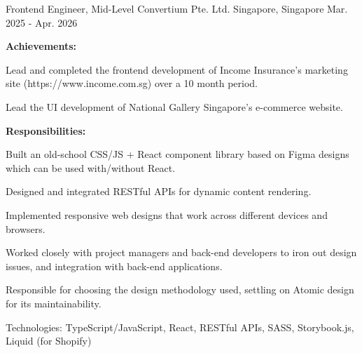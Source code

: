 

\begin{cventries}

  \cventry
    {Frontend Engineer, Mid-Level} %
    {Convertium Pte. Ltd.} %
    {Singapore, Singapore} %
    {Mar. 2025 - Apr. 2026} %
    {
      \textbf{Achievements:}
      \vspace{1.5em}
      \begin{cvitems} %
        \item {Lead and completed the frontend development of Income Insurance's marketing site (https://www.income.com.sg) over a 10 month period.}
        \item {Lead the UI development of National Gallery Singapore's e-commerce website.}
      \end{cvitems}
      \textbf{Responsibilities:}
      \vspace{1.5em}
      \begin{cvitems} %
        \item {Built an old-school CSS/JS + React component library based on Figma designs which can be used with/without React.}
        \item {Designed and integrated RESTful APIs for dynamic content rendering.}
        \item {Implemented responsive web designs that work across different devices and browsers.}
        \item {Worked closely with project managers and back-end developers to iron out design issues, and integration with back-end applications.}
        \item {Responsible for choosing the design methodology used, settling on Atomic design for its maintainability.}
        \item {Technologies: TypeScript/JavaScript, React, RESTful APIs, SASS, Storybook.js, Liquid (for Shopify)}
      \end{cvitems}
    }


\end{cventries}
